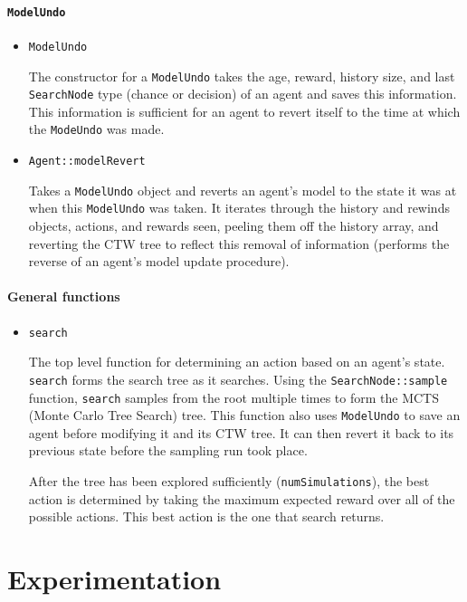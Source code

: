 \documentclass[pdftex,twoside,a4paper]{report}
\begin{document}
\subsubsection{\texttt{ModelUndo}}
\begin{itemize}
\item{\texttt{ModelUndo}

	The constructor for a \texttt{ModelUndo} takes the age, reward, history size, and last \texttt{SearchNode} type (chance or decision) of an agent and saves this information. This information is sufficient for an agent to revert itself to the time at which the \texttt{ModeUndo} was made.

}

\item{\texttt{Agent::modelRevert}

	Takes a \texttt{ModelUndo} object and reverts an agent's model to the state it was at when this \texttt{ModelUndo} was taken. It iterates through the history and rewinds objects, actions, and rewards seen, peeling them off the history array, and reverting the CTW tree to reflect this removal of information (performs the reverse of an agent's model update procedure).

}
\end{itemize}
\subsubsection{General functions}
\begin{itemize}
\item{\texttt{search}
	
	The top level function for determining an action based on an agent's state. \texttt{search} forms the search tree as it searches. Using the \texttt{SearchNode::sample} function, \texttt{search} samples from the root multiple times to form the MCTS (Monte Carlo Tree Search) tree. This function also uses \texttt{ModelUndo} to save an agent before modifying it and its CTW tree. It can then revert it back to its previous state before the sampling run took place.
	
	After the tree has been explored sufficiently (\texttt{numSimulations}), the best action is determined by taking the maximum expected reward over all of the possible actions. This best action is the one that search returns.
}
	
\end{itemize}

\chapter{Experimentation}
\end{document}
